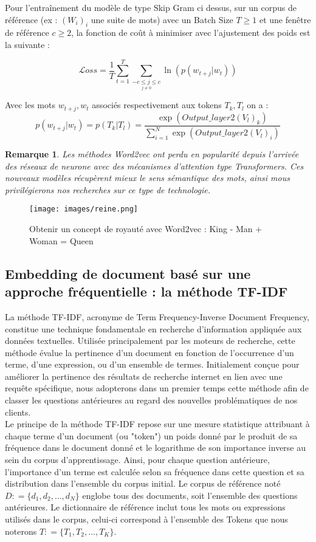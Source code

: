 \documentclass[12pt]{article}
\newtheorem{rmq}{Remarque}
\theoremstyle{definition}
\begin{document}
	Pour l'entraînement du modèle de type Skip Gram ci dessus, sur un corpus  de référence (ex : $(W_i)_i$ une suite de mots) avec un Batch Size  $T \geq 1$ et une fenêtre de référence $c\geq2$, la fonction de coût à minimiser avec l'ajustement des poids est la suivante :  
	
	$$\displaystyle\mathcal{L}oss = \dfrac{1}{T}\sum_{t=1}^{T}\sum_{\underset{j\neq 0}{-c\leq j \leq c}} \ln(p(w_{t+j}|w_t))$$
	
	\noindent Avec les mots $w_{t+j}, w_{t}$ associés respectivement aux tokens $T_k, T_l$ on a :
	 $$\displaystyle p(w_{t+j}|w_t) = p(T_k|T_l) = \dfrac{\exp(Output\_layer2(V_l)_k)}{\sum_{i=1}^{N}\exp(Output\_layer2(V_l)_i)}$$
	
	
	\begin{rmq}
		Les méthodes Word2vec ont perdu en popularité depuis l'arrivée des réseaux de neurone avec des mécanismes d'attention type Transformers. Ces nouveaux modèles récupèrent mieux le sens sémantique des mots, ainsi mous privilégierons nos recherches sur ce type de technologie. 
	\end{rmq}

		\begin{figure*}[!h]
		\centering
		\texttt{[image: images/reine.png]}
		\caption{Obtenir un concept de royauté avec Word2vec : King - Man + Woman = Queen }
	\end{figure*}
	
	
	\subsection{Embedding de document basé sur une approche fréquentielle : la méthode TF-IDF}
	
	
	La méthode TF-IDF, acronyme de Term Frequency-Inverse Document Frequency, constitue une technique fondamentale en recherche d'information appliquée aux données textuelles. Utilisée principalement par les moteurs de recherche, cette méthode évalue la pertinence d'un document en fonction de l'occurrence d'un terme, d'une expression, ou d'un ensemble de termes. Initialement conçue pour améliorer la pertinence des résultats de recherche internet en lien avec une requête spécifique, nous adopterons dans un premier temps cette méthode afin de classer les questions antérieures au regard des nouvelles problématiques de nos clients.\\
	
	Le principe de la méthode TF-IDF repose sur une mesure statistique attribuant à chaque terme d'un document (ou "token") un poids donné par le produit de sa fréquence dans le document donné et le logarithme de son importance inverse au sein du corpus d'apprentissage. Ainsi, pour chaque question antérieure, l'importance d'un terme est calculée selon sa fréquence dans cette question et sa distribution dans l'ensemble du corpus initial. Le corpus de référence noté $D : = \{d_1,d_2,\dots,d_N\}$ englobe tous des documents, soit l'ensemble des questions antérieures. Le dictionnaire de référence inclut tous les mots ou expressions utilisés dans le corpus, celui-ci correspond à l'ensemble des Tokens que nous noterons $T : = \{T_1,T_2,\dots,T_K\}$.\\
	
\end{document}
